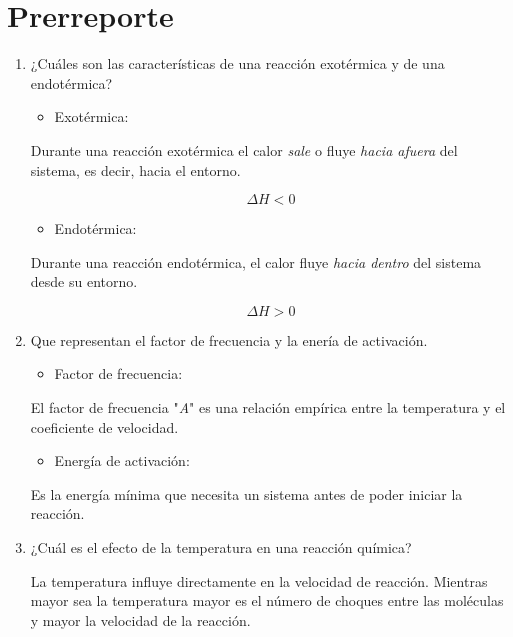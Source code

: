 \section{Prerreporte}
    \begin{enumerate}
        \item ¿Cuáles son las características de una reacción exotérmica y de una endotérmica?
            \begin{itemize}
                \item Exotérmica:
            \end{itemize}
        Durante una reacción exotérmica el calor \textit{sale} o fluye \textit{hacia afuera} del sistema, es decir, hacia el entorno.

                $$\Delta H<0$$

            \begin{itemize}
                \item Endotérmica:
            \end{itemize}
        Durante una reacción endotérmica, el calor fluye \textit{hacia dentro} 
        del sistema desde su entorno.

                $$\Delta H>0$$

        \item Que representan el factor de frecuencia y la enería de activación.
            \begin{itemize}
                \item Factor de frecuencia:
            \end{itemize}
        El factor de frecuencia "\textit{A}" es una relación empírica entre la
        temperatura y el coeficiente de velocidad.

            \begin{itemize}
                \item Energía de activación:
            \end{itemize}

         Es la energía mínima que necesita un sistema antes de poder iniciar la
          reacción.

        \item  ¿Cuál es el efecto de la temperatura en una reacción química?

        La temperatura influye directamente en la velocidad de reacción. Mientras mayor
        sea la temperatura mayor es el número de choques entre las moléculas y mayor 
        la velocidad de la reacción.
    \end{enumerate} 
    
